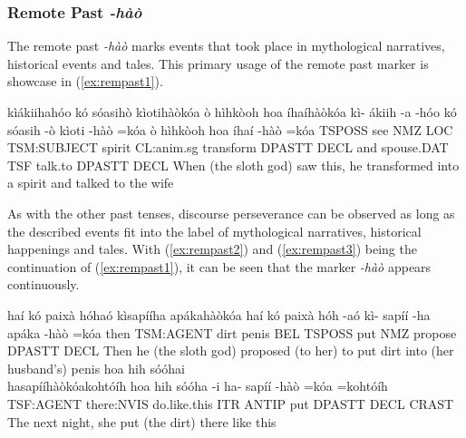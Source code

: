\documentclass[a4paper, 12pt, oneside]{memoir}
\newcommand{\emh}[1]{\textit{#1}}
\begin{document}
\subsubsection{Remote Past \emh{-hàò}}\label{s:rempast}
The remote past \emh{-hàò} marks events that took place in mythological narratives, historical events and tales. This primary usage of the remote past marker is showcase in (\ref{ex:rempast1}).
\begin{examples}
    \ex \label{ex:rempast1}
    \words kìákiihahóo kó sóasihò kìotihàòkóa ò hìhkòoh hoa íhaíhàòkóa
    \bits kì- ákiih -a -hóo kó sóasih -ò kìoti -hàò =kóa ò hìhkòoh hoa íhaí -hàò =kóa 
    \gloss TSPOSS see NMZ LOC TSM:SUBJECT spirit CL:anim.sg transform DPASTT DECL and spouse.DAT TSF talk.to DPASTT DECL  
    \tr When (the sloth god) saw this, he transformed into a spirit and talked to the wife
\end{examples}
As with the other past tenses, discourse perseverance can be observed as long as the described events fit into the label of mythological narratives, historical happenings and tales. With (\ref{ex:rempast2}) and (\ref{ex:rempast3}) being the continuation of (\ref{ex:rempast1}), it can be seen that the marker \emh{-hàò} appears continuously.
\begin{examples}
    \ex \label{ex:rempast2}
    \words haí kó paixà hóhaó kìsapííha apákahàòkóa
    \bits haí kó paixà hóh -aó kì- sapíí -ha apáka -hàò =kóa
    \gloss then TSM:AGENT dirt penis BEL TSPOSS put NMZ propose DPASTT DECL
    \tr Then he (the sloth god) proposed (to her) to put dirt into (her husband's) penis
    \ex \label{ex:rempast3}
    \words hoa hih sóóhai \\ hasapííhàòkóakohtóíh
    \bits hoa hih sóóha -i ha- sapíí -hàò =kóa =kohtóíh
    \gloss TSF:AGENT there:NVIS do.like.this ITR ANTIP put DPASTT DECL CRAST
    \tr The next night, she put (the dirt) there like this
\end{examples}
\end{document}
